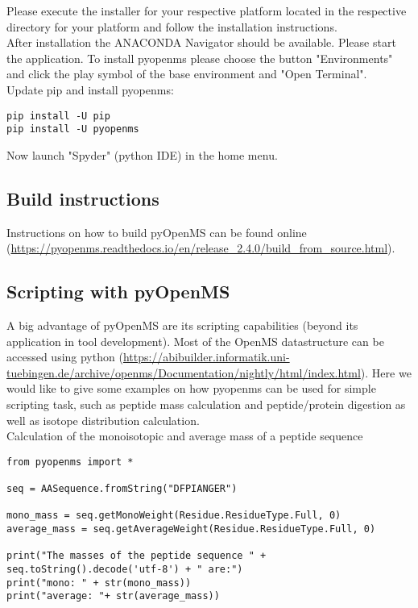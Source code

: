 {\noindent Please execute the installer for your respective platform located in the respective directory for your platform and follow the installation instructions. \\

\noindent After installation the ANACONDA Navigator should be available. Please start the application. To install pyopenms please choose the button "Environments" and click the play symbol of the base environment and "Open Terminal". \\

\noindent  Update pip and install pyopenms:
\begin{lstlisting}
pip install -U pip
pip install -U pyopenms
\end{lstlisting}
    
\noindent  Now launch "Spyder" (python IDE) in the home menu.

\subsection{Build instructions}
Instructions on how to build pyOpenMS can be found online (\url{https://pyopenms.readthedocs.io/en/release_2.4.0/build_from_source.html}).

\subsection{Scripting with pyOpenMS}
A big advantage of pyOpenMS are its scripting capabilities (beyond its application in tool development). Most of the OpenMS datastructure can be accessed using python (\url{https://abibuilder.informatik.uni-tuebingen.de/archive/openms/Documentation/nightly/html/index.html}). Here we would like to give some examples on how pyopenms can be used for simple scripting task, such as peptide mass calculation and peptide/protein digestion as well as isotope distribution calculation. \\

\noindent Calculation of the monoisotopic and average mass of a peptide sequence 
\begin{lstlisting}
from pyopenms import *

seq = AASequence.fromString("DFPIANGER")

mono_mass = seq.getMonoWeight(Residue.ResidueType.Full, 0)
average_mass = seq.getAverageWeight(Residue.ResidueType.Full, 0)

print("The masses of the peptide sequence " + seq.toString().decode('utf-8') + " are:")
print("mono: " + str(mono_mass))
print("average: "+ str(average_mass))
\end{lstlisting}

}
